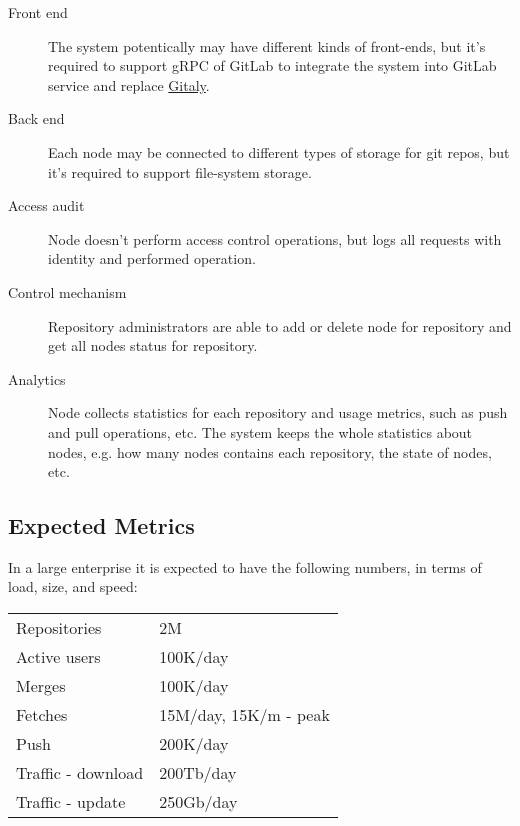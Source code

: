 \documentclass[12pt,oneside]{article}
\begin{document}
\begin{description}
  \item[Front end]
    The system potentically may have different kinds of front-ends,
    but it's required to support gRPC of GitLab to integrate the system
    into GitLab service and replace \href{https://docs.gitlab.com/ee/administration/gitaly/}{Gitaly}.
  \item[Back end]
    Each node may be connected to different types of storage for git repos,
    but it's required to support file-system storage.
  \item[Access audit]
    Node doesn't perform access control operations, but logs all
    requests with identity and performed operation.
  \item[Control mechanism]
    Repository administrators are able to add or delete node for repository and
    get all nodes status for repository.
  \item[Analytics]
    Node collects statistics for each repository and usage metrics, such as
    push and pull operations, etc. The system keeps the whole statistics about
    nodes, e.g. how many nodes contains each repository, the state of nodes, etc.
\end{description}

\subsection{Expected Metrics}
\label{ref:metrics}

In a large enterprise it is expected to have the following
numbers, in terms of load, size, and speed:

\begin{tabular}{ll}
  Repositories & 2M \\
  Active users & 100K/day \\
  Merges & 100K/day \\
  Fetches & 15M/day, 15K/m - peak \\
  Push & 200K/day \\
  Traffic - download & 200Tb/day \\
  Traffic - update & 250Gb/day \\
\end{tabular}

\printbibliography%
\end{document}
